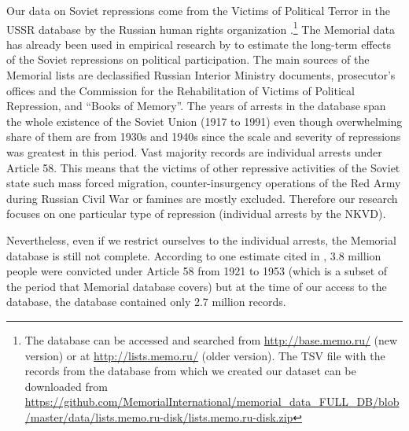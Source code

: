 Our data on Soviet repressions come from  the Victims of Political Terror in the USSR database by the Russian human rights organization \citet{memorial_zhertvy_2017}.\footnote{The database can be accessed and searched from  \url{http://base.memo.ru/} (new version) or at \url{http://lists.memo.ru/} (older version). The TSV file with the records from the database from which we created our dataset can be downloaded from \url{https://github.com/MemorialInternational/memorial_data_FULL_DB/blob/master/data/lists.memo.ru-disk/lists.memo.ru-disk.zip}} 
The Memorial data has already been used in empirical research by \citet{zhukov_stalins_2018} to estimate the long-term  effects of the Soviet repressions on  political participation. 
 The main sources of the Memorial lists are declassified Russian Interior Ministry documents, prosecutor’s offices and the Commission for the Rehabilitation of Victims of Political Repression, and \enquote{Books of Memory}. The years of arrests in the database span the whole existence of the Soviet Union (1917 to 1991) even though overwhelming share of them are from 1930s and 1940s since the scale and severity of repressions was greatest in this period. 
Vast  majority records are individual arrests under  Article 58. 
This means that the victims of other repressive activities of the Soviet state such mass forced migration, counter-insurgency operations of the Red Army during Russian Civil War or famines are mostly excluded. Therefore our research focuses on one  particular type of repression (individual arrests by the NKVD). 

Nevertheless, even if we restrict ourselves to the individual arrests, the Memorial database is still not complete.
According to one estimate cited in \citep[p. 270]{zhukov_stalins_2018},   3.8 million people were convicted under Article 58 from 1921 to 1953 (which is a subset of the period that Memorial database covers) but
at the time of our access to the database, the database contained only 2.7 million records. 


